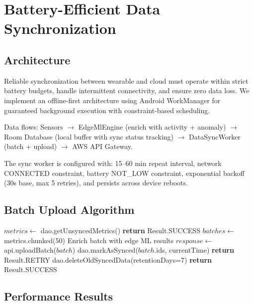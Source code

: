 \documentclass[conference]{IEEEtran}
\begin{document}

\section{Battery-Efficient Data Synchronization}

\subsection{Architecture}
Reliable synchronization between wearable and cloud must operate within strict battery budgets, handle intermittent connectivity, and ensure zero data loss. We implement an offline-first architecture using Android WorkManager for guaranteed background execution with constraint-based scheduling.

Data flows: Sensors $\rightarrow$ EdgeMlEngine (enrich with activity + anomaly) $\rightarrow$ Room Database (local buffer with sync status tracking) $\rightarrow$ DataSyncWorker (batch + upload) $\rightarrow$ AWS API Gateway.

The sync worker is configured with: 15--60 min repeat interval, network CONNECTED constraint, battery NOT\_LOW constraint, exponential backoff (30s base, max 5 retries), and persists across device reboots.

\subsection{Batch Upload Algorithm}
\begin{algorithmic}
\STATE $metrics \leftarrow$ dao.getUnsyncedMetrics()
    \STATE \textbf{return} Result.SUCCESS
\ENDIF
\STATE $batches \leftarrow$ metrics.chunked(50)
    \STATE Enrich batch with edge ML results
    \STATE $response \leftarrow$ api.uploadBatch($batch$)
        \STATE dao.markAsSynced($batch$.ids, currentTime)
    \ELSE
        \STATE \textbf{return} Result.RETRY
    \ENDIF
\ENDFOR
\STATE dao.deleteOldSyncedData(retentionDays=7)
\STATE \textbf{return} Result.SUCCESS
\end{algorithmic}

\subsection{Performance Results}
\end{document}
